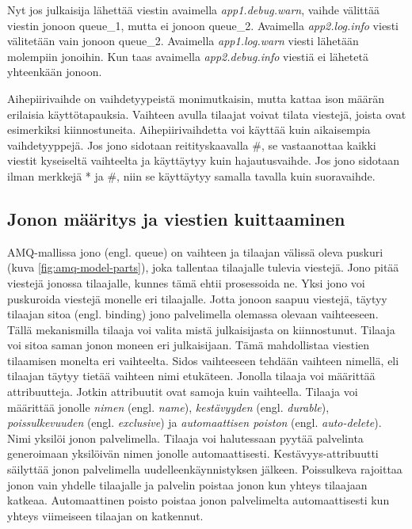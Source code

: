 Nyt jos julkaisija lähettää viestin avaimella \emph{app1.debug.warn}, vaihde välittää viestin jonoon queue\_1, mutta ei jonoon queue\_2. Avaimella \emph{app2.log.info} viesti välitetään vain jonoon queue\_2. Avaimella \emph{app1.log.warn} viesti lähetään molempiin jonoihin. Kun taas avaimella \emph{app2.debug.info} viestiä ei lähetetä yhteenkään jonoon.

Aihepiirivaihde on vaihdetyypeistä monimutkaisin, mutta kattaa ison määrän erilaisia käyttötapauksia. Vaihteen avulla tilaajat voivat tilata viestejä, joista ovat esimerkiksi kiinnostuneita. Aihepiirivaihdetta voi käyttää kuin aikaisempia vaihdetyyppejä. Jos jono sidotaan reitityskaavalla \#, se vastaanottaa kaikki viestit kyseiseltä vaihteelta ja käyttäytyy kuin hajautusvaihde. Jos jono sidotaan ilman merkkejä * ja \#, niin se käyttäytyy samalla tavalla kuin suoravaihde. \mbox{\cite{RabbitMQ-Tutorial-Topics}}


\subsection{Jonon määritys ja viestien kuittaaminen}
AMQ-mallissa jono (engl. queue) on vaihteen ja tilaajan välissä oleva puskuri (kuva \ref{fig:amq-model-parts}), joka tallentaa tilaajalle tulevia viestejä. Jono pitää viestejä jonossa tilaajalle, kunnes tämä ehtii prosessoida ne. Yksi jono voi puskuroida viestejä monelle eri tilaajalle. Jotta jonoon saapuu viestejä, täytyy tilaajan sitoa (engl. binding) jono palvelimella olemassa olevaan vaihteeseen. Tällä mekanismilla tilaaja voi valita mistä julkaisijasta on kiinnostunut. Tilaaja voi sitoa saman jonon moneen eri julkaisijaan. Tämä mahdollistaa viestien tilaamisen monelta eri vaihteelta. Sidos vaihteeseen tehdään vaihteen nimellä, eli tilaajan täytyy tietää vaihteen nimi etukäteen. Jonolla tilaaja voi määrittää attribuutteja. Jotkin attribuutit ovat samoja kuin vaihteella. Tilaaja voi määrittää jonolle \emph{nimen} (engl. \emph{name}), \emph{kestävyyden} (engl. \emph{durable}), \emph{poissulkevuuden} (engl. \emph{exclusive}) ja \emph{automaattisen poiston} (engl. \emph{auto-delete}). Nimi yksilöi jonon palvelimella. Tilaaja voi halutessaan pyytää palvelinta generoimaan yksilöivän nimen jonolle automaattisesti. Kestävyys-attribuutti säilyttää jonon palvelimella uudelleenkäynnistyksen jälkeen. Poissulkeva rajoittaa jonon vain yhdelle tilaajalle ja palvelin poistaa jonon kun yhteys tilaajaan katkeaa. Automaattinen poisto poistaa jonon palvelimelta automaattisesti kun yhteys viimeiseen tilaajan on katkennut. \mbox{\cite{RabbitMQ-AMQP-0-9-1-Model-Explained}}

